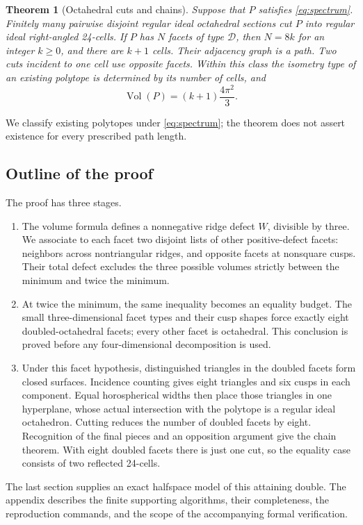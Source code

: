 \documentclass[11pt]{article}
\newtheorem{theorem}{Theorem}[section]
\theoremstyle{remark}
\newcommand{\Vol}{\operatorname{Vol}}
\newcommand{\DBL}{\mathcal D}
\begin{document}
\begin{theorem}[Octahedral cuts and chains]\label{thm:chain}
Suppose that $P$ satisfies \eqref{eq:spectrum}. Finitely many pairwise
disjoint regular ideal octahedral sections cut $P$ into regular ideal
right-angled 24-cells. If $P$ has $N$ facets of type $\DBL$, then
$N=8k$ for an integer $k\ge0$, and there are $k+1$ cells. Their
adjacency graph is a path. Two cuts incident to one cell use opposite
facets. Within this class the isometry type of an existing polytope
is determined by its number of cells, and
\[
 \Vol(P)=(k+1)\frac{4\pi^2}{3}.
\]
\end{theorem}
We classify existing polytopes under \eqref{eq:spectrum}; the theorem
does not assert existence for every prescribed path length.

\subsection{Outline of the proof}

The proof has three stages.
\begin{enumerate}
\item The volume formula defines a nonnegative ridge defect $W$,
divisible by three. We associate to each facet two disjoint lists
of other positive-defect facets: neighbors across nontriangular
ridges, and opposite facets at nonsquare cusps. Their total defect
excludes the three possible volumes strictly between the minimum
and twice the minimum.
\item At twice the minimum, the same inequality becomes an equality
budget. The small three-dimensional facet types and their cusp
shapes force exactly eight doubled-octahedral facets; every other
facet is octahedral. This conclusion is proved before any
four-dimensional decomposition is used.
\item Under this facet hypothesis, distinguished triangles in the
doubled facets form closed surfaces. Incidence counting gives eight
triangles and six cusps in each component. Equal horospherical
widths then place those triangles in one hyperplane, whose actual
intersection with the polytope is a regular ideal octahedron.
Cutting reduces the number of doubled facets by eight. Recognition
of the final pieces and an opposition argument give the chain
theorem. With eight doubled facets there is just one cut, so the
equality case consists of two reflected 24-cells.
\end{enumerate}
The last section supplies an exact halfspace model of this attaining
double. The appendix describes the finite supporting algorithms,
their completeness, the reproduction commands, and the scope of
the accompanying formal verification.
\end{document}
